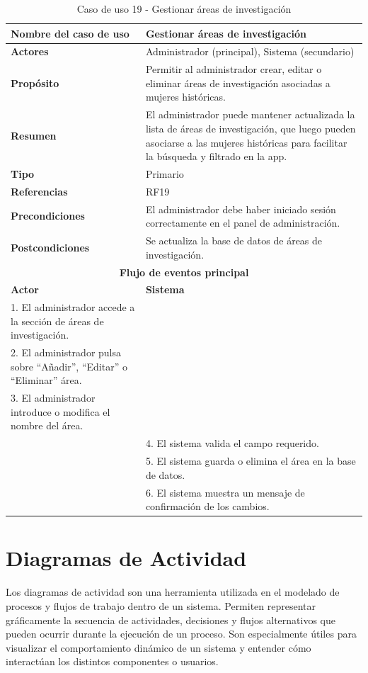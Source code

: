 \begin{table}[H]
\centering
\caption{Caso de uso 19 - Gestionar áreas de investigación}
\begin{tabular}{|p{4.5cm}|p{10.5cm}|}
\hline
\textbf{Nombre del caso de uso} & Gestionar áreas de investigación \\
\hline
\textbf{Actores} & Administrador (principal), Sistema (secundario) \\
\hline
\textbf{Propósito} & Permitir al administrador crear, editar o eliminar áreas de investigación asociadas a mujeres históricas. \\
\hline
\textbf{Resumen} & El administrador puede mantener actualizada la lista de áreas de investigación, que luego pueden asociarse a las mujeres históricas para facilitar la búsqueda y filtrado en la app. \\
\hline
\textbf{Tipo} & Primario \\
\hline
\textbf{Referencias} & RF19 \\
\hline
\textbf{Precondiciones} & El administrador debe haber iniciado sesión correctamente en el panel de administración. \\
\hline
\textbf{Postcondiciones} & Se actualiza la base de datos de áreas de investigación. \\
\hline
\multicolumn{2}{|c|}{\textbf{Flujo de eventos principal}} \\
\hline
\textbf{Actor} & \textbf{Sistema} \\
\hline
1. El administrador accede a la sección de áreas de investigación. & \\
\hline
2. El administrador pulsa sobre “Añadir”, “Editar” o “Eliminar” área. & \\
\hline
3. El administrador introduce o modifica el nombre del área. & \\
\hline
& 4. El sistema valida el campo requerido. \\
\hline
& 5. El sistema guarda o elimina el área en la base de datos. \\
\hline
& 6. El sistema muestra un mensaje de confirmación de los cambios. \\
\hline
\end{tabular}
\end{table}

\clearpage
\section{Diagramas de Actividad}

Los diagramas de actividad son una herramienta utilizada en el modelado de procesos y flujos de trabajo dentro de un sistema. Permiten representar gráficamente la secuencia de actividades, decisiones y flujos alternativos que pueden ocurrir durante la ejecución de un proceso. Son especialmente útiles para visualizar el comportamiento dinámico de un sistema y entender cómo interactúan los distintos componentes o usuarios.

